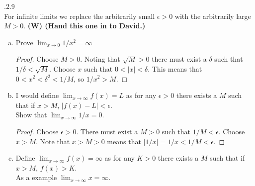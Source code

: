 \documentclass[12pt]{article}
\makeatletter
\theoremstyle{homework}
\newenvironment{exercise}[1]
{\def\@currentlabel{#1}\exercisecore}
{\endexercisecore}
\newcommand\W{{\color{red}\textbf{(W) (Hand this one in to David.)}}}
\makeatother
\begin{document}
\newpage
\begin{exercise}

4.2.9 \\
For infinite limits we replace the arbitrarily small $\epsilon>0$ with the arbitrarily large $M>0$.
\end{exercise}\W
\begin{enumerate}[(a)]
\item
Prove $\lim_{x\rightarrow 0}1/x^2=\infty$
\begin{proof}
Choose $M>0$.  Noting that $\sqrt{M}>0$ there must exist a $\delta$ such that $1/\delta<\sqrt{M}$.  Choose $x$ such that $0<|x|<\delta$.  This means that $0<x^2<\delta^2<1/M$, so $1/x^2>M$.
\end{proof}
\item
I would define $\lim_{x\rightarrow \infty} f(x)=L$ as for any $\epsilon>0$ there exists a $M$ such that if $x>M$, $|f(x)-L|<\epsilon$.\\
Show that $\lim_{x\rightarrow \infty} 1/x=0$.
\begin{proof}
Choose $\epsilon>0$.  There must exist a $M>0$ such that $1/M<\epsilon$.  Choose $x>M$.  Note that $x>M>0$ means that $|1/x|=1/x<1/M<\epsilon$.
\end{proof}
\item
Define $\lim_{x\rightarrow \infty}f(x)=\infty$ as  for any $K>0$ there exists a $M$ such that if $x>M$, $f(x)>K$.\\
As a example $\lim_{x\rightarrow \infty}x=\infty$.
\end{enumerate}
\end{document}
